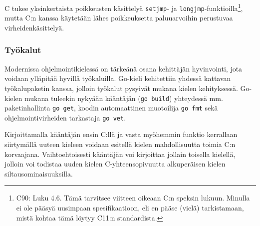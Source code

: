 C tukee yksinkertaista poikkeusten
käsittelyä \texttt{setjmp}- ja
\texttt{longjmp}-funktioilla\footnote{\label{cspecnote}C90: Luku 4.6. Tämä tarvitsee viitteen
oikeaan C:n speksin lukuun. Minulla ei ole pääsyä uusimpaan spesifikaatioon,
eli en pääse (vielä) tarkistamaan, mistä kohtaa tämä löytyy C11:n
standardista.}, mutta C:n kanssa käytetään lähes poikkeuksetta paluuarvoihin
perustuvaa virheidenkäsittelyä\citationneeded.

\subsubsection{Työkalut}

Modernissa ohjelmointikielessä on tärkeänä osana kehittäjän hyvinvointi, jota
voidaan ylläpitää hyvillä työkaluilla. Go-kieli kehitettiin yhdessä kattavan
työkalupaketin kanssa, jolloin työkalut pysyivät mukana kielen kehityksessä.
Go-kielen mukana tuleekin nykyään kääntäjän (\texttt{go build}) yhteydessä mm.
paketinhallinta \texttt{go get}, koodin automaattinen muotoilija \texttt{go
fmt} sekä ohjelmointivirheiden tarkastaja \texttt{go vet}.

Kirjoittamalla kääntäjän ensin C:llä ja vasta myöhemmin funktio kerrallaan
siirtymällä uuteen kieleen voidaan esitellä kielen mahdollisuutta toimia C:n
korvaajana. Vaihtoehtoisesti kääntäjän voi kirjoittaa jollain toisella
kielellä, jolloin voi todistaa uuden kielen C-yhteensopivuutta alkuperäisen
kielen siltausominaisuuksilla.



%
